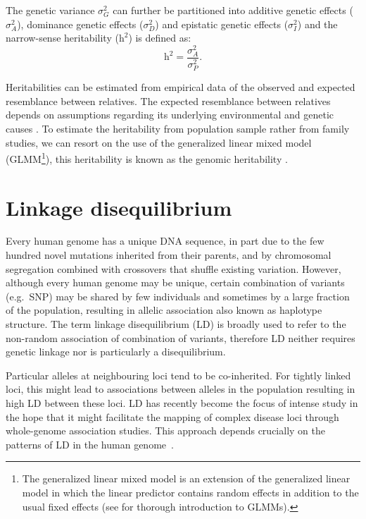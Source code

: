 \documentclass[]{book}
\begin{document}
The genetic variance \(\sigma^2_G\) can further be partitioned into
additive genetic effects (\(\sigma^2_A\)), dominance genetic effects
(\(\sigma^2_D\)) and epistatic genetic effects (\(\sigma^2_I\)) and the
narrow-sense heritability (\(\text{h}^2\)) is defined as:
\[\text{h}^2 = \frac{\sigma^2_A}{\sigma^2_P}.\]

Heritabilities can be estimated from empirical data of the observed and
expected resemblance between relatives. The expected resemblance between
relatives depends on assumptions regarding its underlying environmental
and genetic causes \citep{visscher_heritability_2008}. To estimate the
heritability from population sample rather from family studies, we can
resort on the use of the generalized linear mixed model (GLMM\footnote{The generalized linear mixed model is an extension of the
  generalized linear model \citep{mc_cullagh_generalized_1989} in which the
  linear predictor contains random effects in addition to the usual
  fixed effects (see \citep{stroup2012generalized} for thorough
  introduction to GLMMs).}), this
heritability is known as the genomic heritability \citep{dandine2015use}.

\hypertarget{LD}{%
\section{Linkage disequilibrium}\label{LD}}

Every human genome has a unique DNA sequence, in part due to the few
hundred novel mutations inherited from their parents, and by chromosomal
segregation combined with crossovers that shuffle existing variation.
However, although every human genome may be unique, certain combination
of variants (e.g.~SNP) may be shared by few individuals and sometimes by
a large fraction of the population, resulting in allelic association
also known as haplotype structure. The term linkage disequilibrium (LD)
is broadly used to refer to the non-random association of combination of
variants, therefore LD neither requires genetic linkage nor is
particularly a disequilibrium.

Particular alleles at neighbouring loci tend to be co-inherited. For
tightly linked loci, this might lead to associations between alleles in
the population resulting in high LD between these loci. LD has recently
become the focus of intense study in the hope that it might facilitate
the mapping of complex disease loci through whole-genome association
studies. This approach depends crucially on the patterns of LD in the
human genome~\citep{ardlie_patterns_2002}.
\end{document}
